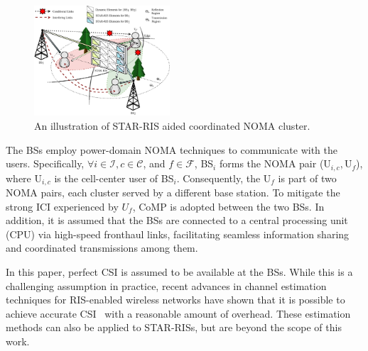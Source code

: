 \documentclass[conference]{IEEEtran}
\begin{document}
\begin{figure}[t]
    \centerline{
        \includegraphics[width=0.45\textwidth]{figs/system.pdf}}
    \caption{An illustration of STAR-RIS aided coordinated NOMA cluster.}
    \label{fig:system}
\end{figure}

The BSs employ power-domain NOMA techniques to communicate with the users. Specifically, $\forall i \in \mathcal{I}, c \in \mathcal{C}$, and $f \in \mathcal{F}$, BS$_i$ forms the NOMA pair (${\text{U}_{i,c}, \text{U}_f}$), where $\text{U}_{i,c}$ is the cell-center user of BS$_i$. Consequently, the U$_f$ is part of two NOMA pairs, each cluster served by a different base station. To mitigate the strong ICI experienced by $U_f$, CoMP is adopted between the two BSs. In addition, it is assumed that the BSs are connected to a central processing unit (CPU) via high-speed fronthaul links, facilitating seamless information sharing and coordinated transmissions among them.

In this paper, perfect CSI is assumed to be available at the BSs. While this is a challenging assumption in practice, recent advances in channel estimation techniques for RIS-enabled wireless networks have shown that it is possible to achieve accurate CSI~\cite{hou2021joint, wei2021channel, taha2021enabling} with a reasonable amount of overhead. These estimation methods can also be applied to STAR-RISs, but are beyond the scope of this work.
\end{document}
